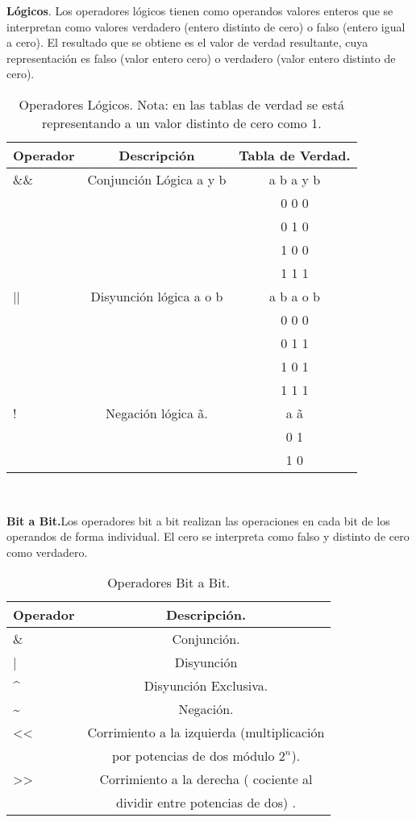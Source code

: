 \textbf{Lógicos}.
Los operadores lógicos tienen como operandos valores enteros que se interpretan como valores
verdadero (entero distinto de cero) o falso (entero igual a cero). El resultado que se obtiene es el
valor de verdad resultante, cuya representación es falso (valor entero cero) o verdadero (valor entero
distinto de cero).
\begin{table}[H]
	\centering
\begin{tabular}{l | c | c } 
Operador & Descripción & Tabla de Verdad. \\ \hline
\&\& & Conjunción Lógica a y b & a b  a y b \\
    & &0 0    0 \\
    & &0 1    0 \\
    & &1 0    0 \\
    & &1 1    1 \\ \hline
|| & Disyunción lógica a o b & a b  a o b \\ 
   &  &0 0    0 \\
   &  &0 1    1 \\ 
   &  &1 0    1 \\
   &  &1 1    1 \\ \hline
!  & Negación lógica \~a. & a \~a \\
   & & 0 1 \\ 
   & & 1 0 \\ \hline		
	\end{tabular} 
\\
	\caption{Operadores Lógicos. Nota: en las tablas de verdad se está representando a un valor distinto de cero como 1.} 
\end{table}

\textbf{Bit a Bit.}Los operadores bit a bit realizan las operaciones en cada bit de los operandos de forma individual.
El cero se interpreta como falso y distinto de cero como verdadero.
\begin{table}[H]
\centering
\begin{tabular}{ l | c }	
Operador & Descripción. \\ \hline
\& & Conjunción. \\ \hline 	
|  & Disyunción \\ \hline 
\textasciicircum{} & Disyunción Exclusiva. \\ \hline 	
\textasciitilde{} & Negación. \\ \hline 
<< & Corrimiento a la izquierda (multiplicación \\	
   & por potencias de dos módulo ${2}^{n}$). \\ \hline	
>> & Corrimiento a la derecha ( cociente al \\ 
   & dividir entre potencias de dos) . \\ \hline				
   \end{tabular}										
\\			
\caption{Operadores Bit a Bit.}
\end{table}																																								

